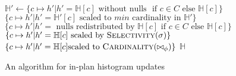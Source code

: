   \begin{algorithmic}
    
		\State $\mathbb{H'} \gets \{ c \mapsto h' | h' = \mathbb{H}[c] \text{ without nulls } \text{ if } c \in C \text{ else } \mathbb{H}[c] \}$
		\State $\{ c \mapsto h' | h' = \mathbb{H'}[c] \text{ scaled to } min \text{ cardinality in } \mathbb{H'} \}$
	\State $\{ c \mapsto h' | h' = \text{ nulls redistributed by } \mathbb{H}[c]  \text{ if } c \in C \text{ else } \mathbb{H}[c]\}$
		\State $\{ c \mapsto h' | h' = \mathbb{H}[c] \text{ scaled by } \Call{Selectivity}{\sigma} \}$
		\State $\{ c \mapsto h' | h' = \mathbb{H}[c] \text{scaled to } \Call{Cardinality}{\bowtie_{\phi}} \}$
	\Else
		\State $\mathbb{H}$
	\EndIf
    \EndFunction
  \end{algorithmic}
  \caption{An algorithm for in-plan histogram updates}
  \label{algo:histogram-transformation}
